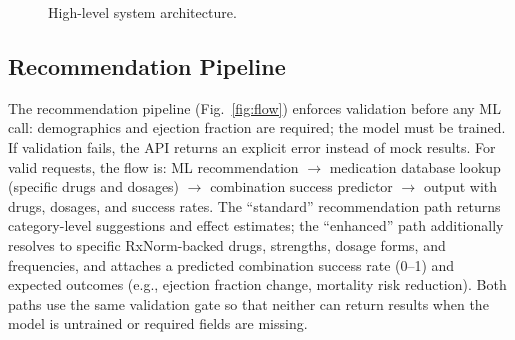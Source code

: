 \documentclass[conference]{IEEEtran}
\begin{document}
\begin{figure}[t]
\centering
{}
\caption{High-level system architecture.}
\label{fig:arch}
\end{figure}

\subsection{Recommendation Pipeline}
The recommendation pipeline (Fig.~\ref{fig:flow}) enforces validation before any ML call: demographics and ejection fraction are required; the model must be trained. If validation fails, the API returns an explicit error instead of mock results. For valid requests, the flow is: ML recommendation $\rightarrow$ medication database lookup (specific drugs and dosages) $\rightarrow$ combination success predictor $\rightarrow$ output with drugs, dosages, and success rates. The ``standard'' recommendation path returns category-level suggestions and effect estimates; the ``enhanced'' path additionally resolves to specific RxNorm-backed drugs, strengths, dosage forms, and frequencies, and attaches a predicted combination success rate (0--1) and expected outcomes (e.g., ejection fraction change, mortality risk reduction). Both paths use the same validation gate so that neither can return results when the model is untrained or required fields are missing.
\end{document}
